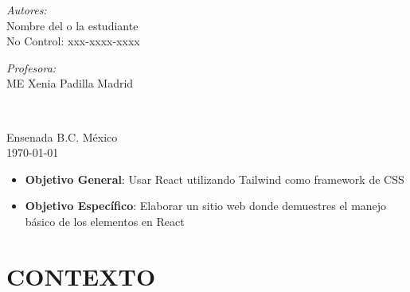 \documentclass[10pt]{article}
\begin{document}
\begin{center}
\begin{minipage}{0.46\textwidth}
\begin{flushleft}
\emph{Autores:}\\	
Nombre del o la estudiante\\
No Control: xxx-xxxx-xxxx
\end{flushleft}																		%
\end{minipage}		
\begin{minipage}{0.52\textwidth}		
\vspace{-0.6cm}											%
\begin{flushright} \large															%
\emph{Profesora:} \\																	%
ME Xenia Padilla Madrid\\										%
\end{flushright}																	%
\end{minipage}	
\vspace*{1cm}
 	
 		\\																		%
\vspace{2cm} 																				
\begin{center}	
Ensenada B.C. México \\
{\large \today}																	%
 			\end{center}												  						
\end{center}							 											
				
\newpage																		

	\begin{shaded}
		\begin{itemize}
			\item \textbf{Objetivo General}: Usar React utilizando Tailwind como framework de CSS
			\item \textbf{Objetivo Específico}: Elaborar un sitio web donde demuestres el manejo básico de los elementos en React
		\end{itemize}
	
	\end{shaded}

\section{CONTEXTO}
\end{document}
